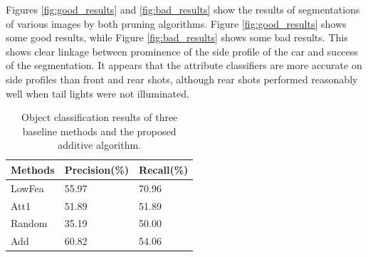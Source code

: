\documentclass[10pt,twocolumn,letterpaper]{article}
\begin{document}
Figures \ref{fig:good_results} and \ref{fig:bad_results} show the
results of segmentations of various images by both pruning
algorithms. Figure \ref{fig:good_results} shows some good results,
while Figure \ref{fig:bad_results} shows some bad results. This
shows clear linkage between prominence of the side profile of the
car and success of the segmentation. It appears that the attribute
classifiers are more accurate on side profiles than front and rear
shots, although rear shots performed reasonably well when tail
lights were not illuminated.

\begin{table}
\centering
\begin{tabular}{|l|l|l|}
\hline Methods & Precision(\%) & Recall(\%) \\
\hline LowFea  & 55.97 & 70.96 \\
\hline Att1    & 51.89 & 51.89 \\
\hline Random  & 35.19 & 50.00 \\
\hline Add     & 60.82 & 54.06 \\
\hline
\end{tabular}
\caption{Object classification results of three baseline methods and the proposed additive algorithm.}
\label{table:aresults}
\end{table}
\end{document}
